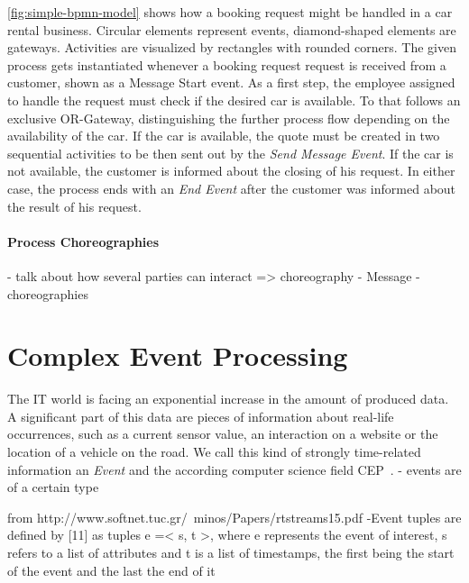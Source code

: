 \autoref{fig:simple-bpmn-model} shows how a booking request might be handled in a car rental business.
Circular elements represent events, diamond-shaped elements are gateways. Activities are visualized by rectangles with rounded corners.
The given process gets instantiated whenever a booking request request is received from a customer, shown as a Message Start event. 
As a first step, the employee assigned to handle the request must check if the desired car is available. To that follows an exclusive OR-Gateway, distinguishing the further process flow depending on the availability of the car.
If the car is available, the quote must be created in two sequential activities to be then sent out by the \textit{Send Message Event}. If the car is not available, the customer is informed about the closing of his request. 
In either case, the process ends with an \textit{End Event} after the customer was informed about the result of his request.


\paragraph{Process Choreographies}
- talk about how several parties can interact => choreography
- Message
- choreographies



\section{Complex Event Processing}\label{ch:bg:cep}
The IT world is facing an exponential increase in the amount of produced data. A significant part of this data are pieces of information about real-life occurrences, such as a current sensor value, an interaction on a website or the location of a vehicle on the road.
We call this kind of strongly time-related information an \textit{Event} and the according computer science field \ac{CEP}~\cite{evtprocessing}.
- events are of a certain type

from http://www.softnet.tuc.gr/~minos/Papers/rtstreams15.pdf
-Event tuples are defined by [11] as tuples e =< s, t >,
where e represents the event of interest, s refers to a list
of attributes and t is a list of timestamps, the first being
the start of the event and the last the end of it

